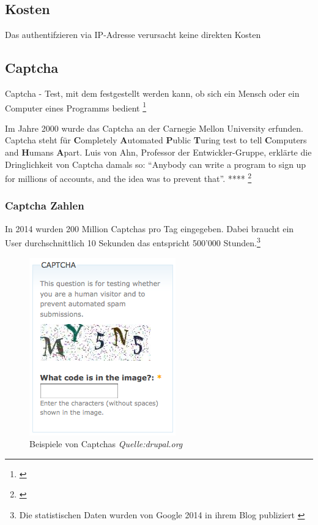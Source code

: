 \subsection{Kosten}\label{kosten-2}

Das authentifzieren via IP-Adresse verursacht keine direkten Kosten

\subsection{Captcha}\label{captcha}

Captcha - Test, mit dem festgestellt werden kann, ob sich ein Mensch
oder ein Computer eines Programms bedient \footnote{\autocite{duden}}

Im Jahre 2000 wurde das Captcha an der Carnegie Mellon University
erfunden. Captcha steht für \textbf{C}ompletely \textbf{A}utomated
\textbf{P}ublic \textbf{T}uring test to tell \textbf{C}omputers and
\textbf{H}umans \textbf{A}part. Luis von Ahn, Professor der
Entwickler-Gruppe, erklärte die Dringlichkeit von Captcha damals so:
``Anybody can write a program to sign up for millions of accounts, and
the idea was to prevent that''. **** \footnote{\autocite{captcha}}

\subsubsection{Captcha Zahlen}\label{captcha-zahlen}

In 2014 wurden 200 Million Captchas pro Tag eingegeben. Dabei braucht
ein User durchschnittlich 10 Sekunden das entspricht 500'000
Stunden.\footnote{Die statistischen Daten wurden von Google 2014 in
  ihrem Blog publiziert \autocite{googlecaptcha}}

\begin{figure}[htbp]
\centering
\includegraphics{images/captcha.png}
\caption{Beispiele von Captchas \emph{Quelle:drupal.org}}
\end{figure}

